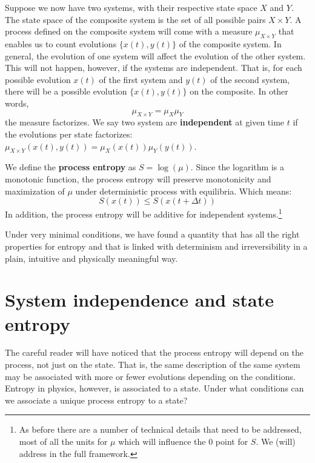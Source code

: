 \documentclass[letterpaper,twocolumn]{article}
\begin{document}
Suppose we now have two systems, with their respective state space $X$ and $Y$. The state space of the composite system is the set of all possible pairs $X \times Y$. A process defined on the composite system will come with a measure $\mu_{X \times Y}$ that enables us to count evolutions $\{x(t), y(t)\}$ of the composite system. In general, the evolution of one system will affect the evolution of the other system. This will not happen, however, if the systems are independent. That is, for each possible evolution $x(t)$ of the first system and $y(t)$ of the second system, there will be a possible evolution $\{x(t), y(t)\}$ on the composite. In other words,
\begin{equation}
	\mu_{X \times Y} = \mu_X \mu_Y
\end{equation}
the measure factorizes. We say two system are \textbf{independent} at given time $t$ if the evolutions per state factorizes: $\mu_{X \times Y}(x(t), y(t)) = \mu_X (x(t)) \mu_Y (y(t))$.

We define the \textbf{process entropy} as $S = \log(\mu)$. Since the logarithm is a monotonic function, the process entropy will preserve monotonicity and maximization of $\mu$ under deterministic process with equilibria. Which means:
\begin{equation}\label{ov_entropy_increases}
S(x(t)) \leq S(x(t + \Delta t))
\end{equation}
In addition, the process entropy will be additive for independent systems.\footnote{As before there are a number of technical details that need to be addressed, most of all the units for $\mu$ which will influence the 0 point for $S$. We (will) address in the full framework.}

Under very minimal conditions, we have found a quantity that has all the right properties for entropy and that is linked with determinism and irreversibility in a plain, intuitive and physically meaningful way.

\section{System independence and state entropy}

The careful reader will have noticed that the process entropy will depend on the process, not just on the state. That is, the same description of the same system may be associated with more or fewer evolutions depending on the conditions. Entropy in physics, however, is associated to a state. Under what conditions can we associate a unique process entropy to a state?
\end{document}
